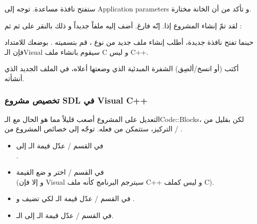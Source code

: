 ستفتح نافذة مساعدة. توجه إلى 
\textenglish{Application parameters}
و تأكد من أن الخانة
مختارة.


لقد تمّ إنشاء المشروع إذا. إنّه فارغ. أضف إليه ملفاً جديداً و ذلك بالنقر على
ثم
ثم
 :


حينما تفتح نافذة جديدة، أطلب إنشاء ملف جديد من نوع
،
قم بتسميته
.
بوضعك للامتداد
فإن الـ\textenglish{Visual}
سيقوم بانشاء ملف
\textenglish{C}
و ليس
\textenglish{C++}.

أكتب (أو انسخ/ألصِق) الشفرة المبدئية الذي وضعتها أعلاه، في الملف الجديد الذي أنشأته.

\subsubsection{تخصيص مشروع \textenglish{SDL} في \textenglish{Visual C++}}

التعديل على المشروع أصعب قليلاً مما هو الحال مع الـ\textenglish{Code::Blocks}،
لكن بقليل من التركيز، ستتمكن من فعله. توجّه إلى خصائص المشروع من
 / .

\begin{itemize}
	\item في القسم
	 / 
	عدّل قيمة الـ
	إلى\\
	.
	\item في القسم 
	 / 
	اختر
	و ضع القيمة\\
	(و إلا فإن
	\textenglish{Visual}
	سيترجم البرنامج كأنه ملف
	\textenglish{C++}
	و ليس كملف
	\textenglish{C}).
	\item في القسم  
	 / 
	عدّل قيمة الـ
	لكي تضيف
	و
	.
	\item في القسم
	 / 
	عدّل قيمة الـ
	إلى الـ.
\end{itemize}


